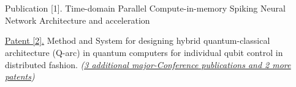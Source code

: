 \documentclass[letterpaper,11pt]{article}
\makeatletter
\newcommand{\resumeItem}[1]{
  \item\small{
    {#1 \vspace{-2pt}}
  }
}
\newcommand{\resumeSubheading}[4]{
  \vspace{-1pt}\item
    \begin{tabular*}{0.97\textwidth}{l@{\extracolsep{\fill}}r}
      \textbf{#1} & #2 \\
      \textit{\small#3} & \textit{\small #4} \\
    \end{tabular*}\vspace{-5pt}
}
\newcommand{\resumeSubHeadingListStart}{\begin{itemize}[leftmargin=0.01in, label={}]}
\newcommand{\resumeSubHeadingListEnd}{\end{itemize}}
\newcommand{\resumeItemListStart}{\begin{itemize}}
\newcommand{\resumeItemListEnd}{\end{itemize}\vspace{-5pt}}
\makeatother
\begin{document}

\section{\normalsize{}}

Publication [1]. {Time-domain Parallel Compute-in-memory Spiking Neural Network Architecture and acceleration }


\href{https://scholar.google.com/citations?user=uoffd9cAAAAJ&hl=en}{Patent [2].} Method and System for designing hybrid quantum-classical architecture (Q-arc) in quantum computers for individual qubit control in distributed fashion. \textit{(\underline{\href{https://scholar.google.com/citations?user=uoffd9cAAAAJ&hl=en}{3 additional major-Conference publications and 2 more patents}})} 

 
\end{document}
